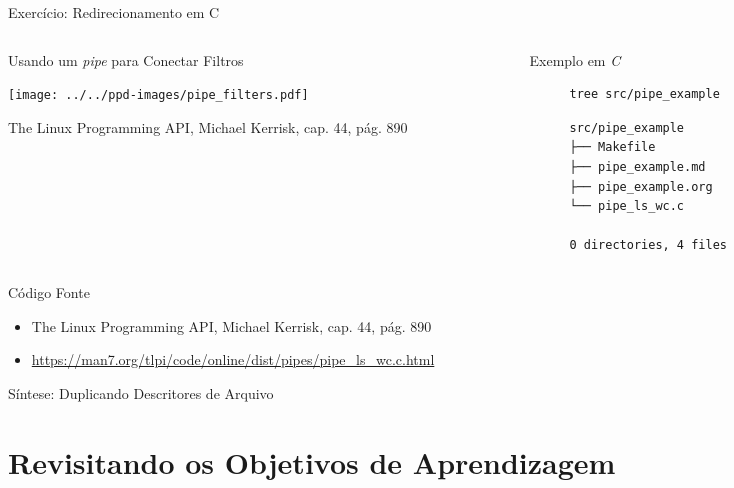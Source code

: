 \documentclass[10pt, compress, aspectratio=169, xcolor={table,usenames,dvipsnames}]{beamer}
\begin{document}
\begin{frame}[label={sec:org4a40614},fragile]{Exercício: Redirecionamento em C}
 \begin{columns}
\begin{column}{0.5\columnwidth}
\begin{block}{Usando um \emph{pipe} para Conectar Filtros}
\begin{center}
\texttt{[image: ../../ppd-images/pipe\_filters.pdf]}
\end{center}

\begin{center}
\scriptsize
The Linux Programming API, Michael Kerrisk, cap. 44, pág. 890
\end{center}
\end{block}
\end{column}

\begin{column}{0.3\columnwidth}
\begin{block}{Exemplo em \emph{C}}
\begin{figure}
\begin{minipage}{\textwidth}
\begin{verbatim}
tree src/pipe_example
\end{verbatim}

\begin{verbatim}
src/pipe_example
├── Makefile
├── pipe_example.md
├── pipe_example.org
└── pipe_ls_wc.c

0 directories, 4 files
\end{verbatim}


\end{minipage}
\end{figure}
\end{block}
\end{column}
\end{columns}

\begin{block}{Código Fonte}
\begin{itemize}
\item The Linux Programming API, Michael Kerrisk, cap. 44, pág. 890
\item \url{https://man7.org/tlpi/code/online/dist/pipes/pipe\_ls\_wc.c.html}
\end{itemize}
\end{block}
\end{frame}

\begin{frame}[label={sec:org59ffaec}]{Síntese: Duplicando Descritores de Arquivo}
\end{frame}
\section{Revisitando os Objetivos de Aprendizagem}
\label{sec:org96cb597}
\maketitle
\end{document}
